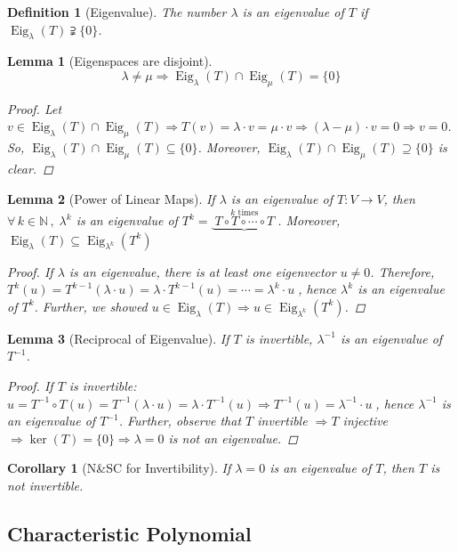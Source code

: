 \documentclass[12pt]{article}
\let\RA\Rightarrow
\newcommand{\Forall}[1]{\forall\,{#1}\,,\;}
\DeclareMathOperator{\Eig}{Eig}
\newtheorem{definition}{Definition}[subsection]
\newtheorem{lemma}{Lemma}[subsection]
\newtheorem{corollary}{Corollary}[subsection]
\begin{document}
\begin{definition}[Eigenvalue]
  The number $\lambda$ is an eigenvalue of $T$ if $\Eig_{\lambda}(T)\supsetneqq\{0\}$.
\end{definition}

\begin{lemma}[Eigenspaces are disjoint]
  $$\lambda\neq\mu\RA\Eig_\lambda(T)\cap \Eig_\mu(T)=\{0\}$$
  \begin{proof}
    Let $v\in \Eig_\lambda(T)\cap \Eig_\mu(T)\RA T(v)=\lambda\cdot v=\mu\cdot v\RA (\lambda-\mu)\cdot v=0\RA v=0$. So, $\Eig_\lambda(T)\cap \Eig_\mu(T)\subseteq\{0\}$. Moreover, $\Eig_\lambda(T)\cap \Eig_\mu(T)\supseteq\{0\}$ is clear.
  \end{proof}
\end{lemma}

\begin{lemma}[Power of Linear Maps]
  If $\lambda$ is an eigenvalue of $T:V\to V$, then $\Forall{k\in\mathbb{N}}\lambda^k$ is an eigenvalue of $T^k=\underbrace{\;T\circ T\circ \cdots\circ T\;}^{k\text{ times}}$. Moreover, $\Eig_\lambda(T)\subseteq \Eig_{\lambda^k}(T^k)$
  \begin{proof}
    If $\lambda$ is an eigenvalue, there is at least one eigenvector $u\neq 0$. Therefore, $T^k(u)=T^{k-1}(\lambda\cdot u)=\lambda\cdot T^{k-1}(u)=\cdots=\lambda^k\cdot u\;$, hence $\lambda^k$ is an eigenvalue of $T^k$. Further, we showed $u\in \Eig_\lambda(T)\RA u\in\Eig_{\lambda^k}(T^k)$.
  \end{proof}
\end{lemma}

\begin{lemma}[Reciprocal of Eigenvalue]
  If $T$ is invertible, $\lambda^{-1}$ is an eigenvalue of $T^{-1}$.
  \begin{proof}
    If $T$ is invertible: $u=T^{-1}\circ T(u)=T^{-1}(\lambda\cdot u)=\lambda\cdot T^{-1}(u)\RA T^{-1}(u)=\lambda^{-1}\cdot u\;$, hence $\lambda^{-1}$ is an eigenvalue of $T^{-1}$. Further, observe that $T$ invertible $\RA T$ injective $\RA \ker(T)=\{0\}\RA \lambda=0$ is not an eigenvalue.
  \end{proof}
\end{lemma}

\begin{corollary}[N\&SC for Invertibility]
  If $\lambda=0$ is an eigenvalue of $T$, then $T$ is not invertible.
\end{corollary}

\subsection{Characteristic Polynomial}
\end{document}
